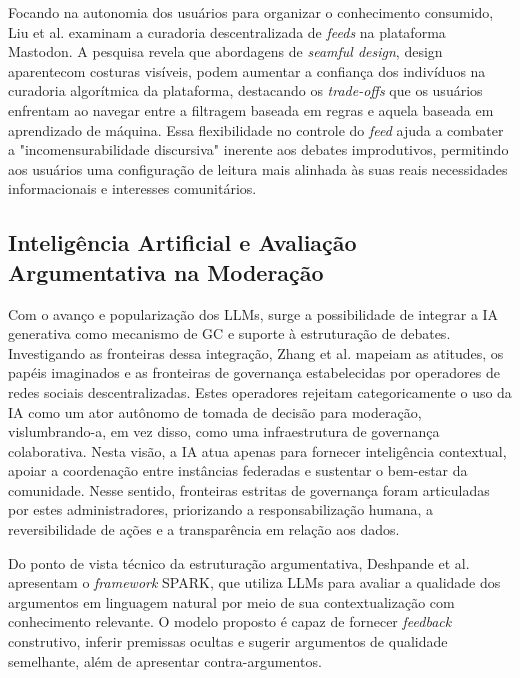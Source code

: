 \documentclass[conference]{IEEEtran} \IEEEoverridecommandlockouts %
\begin{document}
Focando na autonomia dos usuários para organizar o conhecimento consumido, Liu et al. \cite{liuUnderstandingDecentralizedSocial2025} examinam a curadoria descentralizada de \textit{feeds} na plataforma Mastodon. A pesquisa revela que abordagens de \textit{seamful design}, design aparentecom costuras visíveis, podem aumentar a confiança dos indivíduos na curadoria algorítmica da plataforma, destacando os \textit{trade-offs} que os usuários enfrentam ao navegar entre a filtragem baseada em regras e aquela baseada em aprendizado de máquina. Essa flexibilidade no controle do \textit{feed} ajuda a combater a "incomensurabilidade discursiva" inerente aos debates improdutivos, permitindo aos usuários uma configuração de leitura mais alinhada às suas reais necessidades informacionais e interesses comunitários.

\subsection{Inteligência Artificial e Avaliação Argumentativa na Moderação}

Com o avanço e popularização dos LLMs, surge a possibilidade de integrar a IA generativa como mecanismo de GC e suporte à estruturação de debates. Investigando as fronteiras dessa integração, Zhang et al. \cite{zhangAttitudesImaginedRoles2026} mapeiam as atitudes, os papéis imaginados e as fronteiras de governança estabelecidas por operadores de redes sociais descentralizadas. Estes operadores rejeitam categoricamente o uso da IA como um ator autônomo de tomada de decisão para moderação, vislumbrando-a, em vez disso, como uma infraestrutura de governança colaborativa. Nesta visão, a IA atua apenas para fornecer inteligência contextual, apoiar a coordenação entre instâncias federadas e sustentar o bem-estar da comunidade. Nesse sentido, fronteiras estritas de governança foram articuladas por estes administradores, priorizando a responsabilização humana, a reversibilidade de ações e a transparência em relação aos dados.


Do ponto de vista técnico da estruturação argumentativa, Deshpande et al. \cite{deshpandeContextualizingArgumentQuality2024} apresentam o \textit{framework} SPARK, que utiliza LLMs para avaliar a qualidade dos argumentos em linguagem natural por meio de sua contextualização com conhecimento relevante. O modelo proposto é capaz de fornecer \textit{feedback} construtivo, inferir premissas ocultas e sugerir argumentos de qualidade semelhante, além de apresentar contra-argumentos. 
\end{document}
